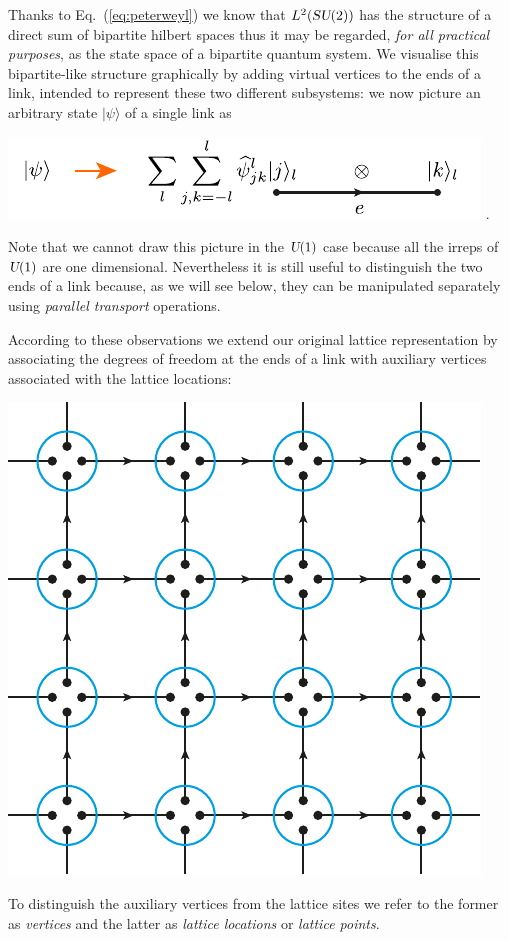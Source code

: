 \documentclass[twocolumn,lengthcheck,superscriptaddress]{revtex4-1}
\def\su2{\textsl{SU}(2)}
\def\uone{\textsl{U}(1)}
\theoremstyle{definition}
\theoremstyle{remark}
\begin{document}
Thanks to Eq.~(\ref{eq:peterweyl}) we know that $L^2(\su2)$ has the structure of a direct sum of bipartite hilbert spaces thus it may be regarded, \emph{for all practical purposes}, as the state space of a bipartite quantum system. We visualise this bipartite-like structure graphically by adding virtual vertices to the ends of a link, intended to represent these two different subsystems: we now picture an arbitrary state $|\psi\rangle$ of a single link as  
\begin{center}
\includegraphics{edgespace.pdf} \quad .
\end{center}
Note that we cannot draw this picture in the $\uone$ case because all the irreps of $\uone$ are one dimensional. Nevertheless it is still useful to distinguish the two ends of a link because, as we will see below, they can be manipulated separately using \emph{parallel transport} operations.

According to these observations we extend our original lattice representation by associating the degrees of freedom at the ends of a link with auxiliary vertices associated with the lattice locations:
\begin{center}
	\includegraphics{decoratedlattice2.pdf}
\end{center}
To distinguish the auxiliary vertices from the lattice sites we refer to the former as \emph{vertices} and the latter as \emph{lattice locations} or \emph{lattice points}.
 
\end{document}
